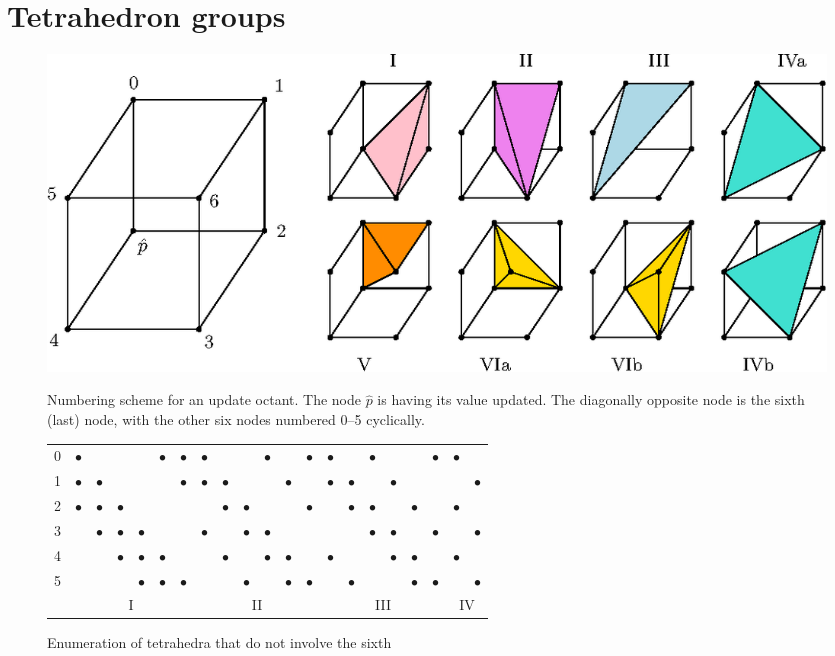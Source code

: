 \documentclass[eikonal.tex]{subfiles}
\begin{document}
\section{Tetrahedron groups}

\begin{figure}[H]
  \centering
  \includegraphics{simplex-groups.eps}
  \caption{Numbering scheme for an update octant. The node $\hat{p}$
    is having its value updated. The diagonally opposite node is the
    sixth (last) node, with the other six nodes numbered 0--5
    cyclically.}\label{fig:octant-numbering}
  \vspace{1em}
  \begin{tabular}{c|cccccc|cccccc|cccccc|cc}
    0 & $\bullet$ & & & & $\bullet$ & $\bullet$ & $\bullet$ & & & $\bullet$ & & $\bullet$ & $\bullet$ & & $\bullet$ & & & $\bullet$ & $\bullet$ & \\
    1 & $\bullet$ & $\bullet$ & & & & $\bullet$ & $\bullet$ & $\bullet$ & & & $\bullet$ & & $\bullet$ & $\bullet$ & & $\bullet$ & & & & $\bullet$ \\
    2 & $\bullet$ & $\bullet$ & $\bullet$ & & & & & $\bullet$ & $\bullet$ & & & $\bullet$ & & $\bullet$ & $\bullet$ & & $\bullet$ & & $\bullet$ & \\
    3 & & $\bullet$ & $\bullet$ & $\bullet$ & & & $\bullet$ & & $\bullet$ & $\bullet$ & & & & & $\bullet$ & $\bullet$ & & $\bullet$ & & $\bullet$ \\
    4 & & & $\bullet$ & $\bullet$ & $\bullet$ & & & $\bullet$ & & $\bullet$ & $\bullet$ & & $\bullet$ & & & $\bullet$ & $\bullet$ & & $\bullet$ & \\
    5 & & & & $\bullet$ & $\bullet$ & $\bullet$ & & & $\bullet$ & & $\bullet$ & $\bullet$ & & $\bullet$ & & & $\bullet$ & $\bullet$ & & $\bullet$ \\
    \multicolumn{1}{c}{} & \multicolumn{6}{c}{I} & \multicolumn{6}{c}{II} & \multicolumn{6}{c}{III} & \multicolumn{2}{c}{IV}
  \end{tabular}
  \caption{Enumeration of tetrahedra that do not involve the sixth
}
\end{figure}
\end{document}
